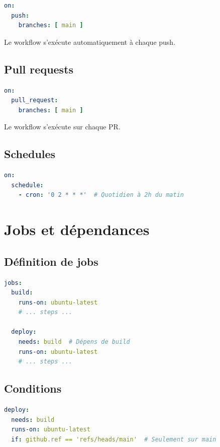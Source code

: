 \documentclass[12pt,a4paper,twoside]{report}
\begin{document}
\begin{lstlisting}[language=yaml]
on:
  push:
    branches: [ main ]
\end{lstlisting}

Le workflow s'exécute automatiquement à chaque push.

\subsection{Pull requests}

\begin{lstlisting}[language=yaml]
on:
  pull_request:
    branches: [ main ]
\end{lstlisting}

Le workflow s'exécute sur chaque PR.

\subsection{Schedules}

\begin{lstlisting}[language=yaml]
on:
  schedule:
    - cron: '0 2 * * *'  # Quotidien à 2h du matin
\end{lstlisting}

\section{Jobs et dépendances}

\subsection{Définition de jobs}

\begin{lstlisting}[language=yaml]
jobs:
  build:
    runs-on: ubuntu-latest
    # ... steps ...

  deploy:
    needs: build  # Dépens de build
    runs-on: ubuntu-latest
    # ... steps ...
\end{lstlisting}

\subsection{Conditions}

\begin{lstlisting}[language=yaml]
deploy:
  needs: build
  runs-on: ubuntu-latest
  if: github.ref == 'refs/heads/main'  # Seulement sur main
\end{lstlisting}
\end{document}
